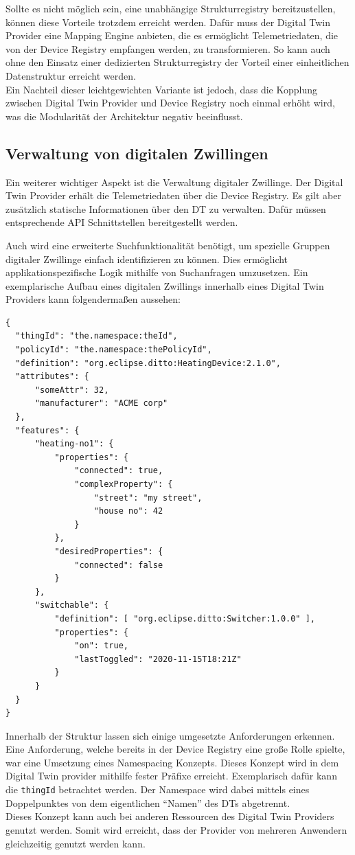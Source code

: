 Sollte es nicht möglich sein, eine unabhängige Strukturregistry bereitzustellen, können diese Vorteile trotzdem erreicht werden. Dafür muss der Digital Twin Provider eine Mapping Engine anbieten, die es ermöglicht Telemetriedaten, die von der Device Registry empfangen werden, zu transformieren. So kann auch ohne den Einsatz einer dedizierten Strukturregistry der Vorteil einer einheitlichen Datenstruktur erreicht werden.\\
Ein Nachteil dieser leichtgewichten Variante ist jedoch, dass die Kopplung zwischen Digital Twin Provider und Device Registry noch einmal erhöht wird, was die Modularität der Architektur negativ beeinflusst.

\subsection{Verwaltung von digitalen Zwillingen}

Ein weiterer wichtiger Aspekt ist die Verwaltung digitaler Zwillinge. Der Digital Twin Provider erhält die Telemetriedaten über die Device Registry. Es gilt aber zusätzlich statische Informationen über den \ac{DT} zu verwalten. Dafür müssen entsprechende API Schnittstellen bereitgestellt werden.

Auch wird eine erweiterte Suchfunktionalität benötigt, um spezielle Gruppen digitaler Zwillinge einfach identifizieren zu können. Dies ermöglicht applikationspezifische Logik mithilfe von Suchanfragen umzusetzen. Ein exemplarische Aufbau eines digitalen Zwillings innerhalb eines Digital Twin Providers kann folgendermaßen aussehen:

\begin{verbatim}
{
  "thingId": "the.namespace:theId",
  "policyId": "the.namespace:thePolicyId",
  "definition": "org.eclipse.ditto:HeatingDevice:2.1.0",
  "attributes": {
      "someAttr": 32,
      "manufacturer": "ACME corp"
  },
  "features": {
      "heating-no1": {
          "properties": {
              "connected": true,
              "complexProperty": {
                  "street": "my street",
                  "house no": 42
              }
          },
          "desiredProperties": {
              "connected": false
          }
      },
      "switchable": {
          "definition": [ "org.eclipse.ditto:Switcher:1.0.0" ],
          "properties": {
              "on": true,
              "lastToggled": "2020-11-15T18:21Z"
          }
      }
  }
}
\end{verbatim}

Innerhalb der Struktur lassen sich einige umgesetzte Anforderungen erkennen. Eine Anforderung, welche bereits in der Device Registry eine große Rolle spielte, war eine Umsetzung eines Namespacing Konzepts. Dieses Konzept wird in dem Digital Twin provider mithilfe fester Präfixe erreicht. Exemplarisch dafür kann die \texttt{thingId} betrachtet werden. Der Namespace wird dabei mittels eines Doppelpunktes von dem eigentlichen \enquote{Namen} des \ac{DT}s abgetrennt. \\
Dieses Konzept kann auch bei anderen Ressourcen des Digital Twin Providers genutzt werden. Somit wird erreicht, dass der Provider von mehreren Anwendern gleichzeitig genutzt werden kann.


